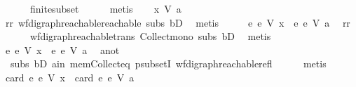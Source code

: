 \begin{isabellebody}
\ \ \ \ \ \ finite{\isacharunderscore}{\kern0pt}subset\isanewline
\ \ \ \ \isamarkupfalse%
\ metis\isanewline
\ \ \isamarkupfalse%
\ {\isachardoublequoteopen}x\ {\isasymrightarrow}\isactrlsup {\isacharasterisk}{\kern0pt}\isactrlbsub V\isactrlesub \ a{\isachardoublequoteclose}\ \isamarkupfalse%
\ rr\ wf{\isacharunderscore}{\kern0pt}digraph{\isachardot}{\kern0pt}reachable{}{\isacharunderscore}{\kern0pt}reachable\ subs\ bD{}\ \isamarkupfalse%
\ metis\isanewline
\ \ \isamarkupfalse%
\ \isamarkupfalse%
\ {\isachardoublequoteopen}{\isacharbraceleft}{\kern0pt}e{\isachardot}{\kern0pt}\ e\ {\isasymrightarrow}\isactrlsup {\isacharasterisk}{\kern0pt}\isactrlbsub V\isactrlesub \ x{\isacharbraceright}{\kern0pt}\ {\isasymsubseteq}\ {\isacharbraceleft}{\kern0pt}e{\isachardot}{\kern0pt}\ e\ {\isasymrightarrow}\isactrlsup {\isacharasterisk}{\kern0pt}\isactrlbsub V\isactrlesub \ a{\isacharbraceright}{\kern0pt}{\isachardoublequoteclose}\ \isamarkupfalse%
\ rr\isanewline
\ \ \ \ \ \ wf{\isacharunderscore}{\kern0pt}digraph{\isachardot}{\kern0pt}reachable{\isacharunderscore}{\kern0pt}trans\ Collect{\isacharunderscore}{\kern0pt}mono\ subs\ bD{}\ \isamarkupfalse%
\ metis\isanewline
\ \ \isamarkupfalse%
\ \isamarkupfalse%
\ {\isachardoublequoteopen}{\isacharbraceleft}{\kern0pt}e{\isachardot}{\kern0pt}\ e\ {\isasymrightarrow}\isactrlsup {\isacharasterisk}{\kern0pt}\isactrlbsub V\isactrlesub \ x{\isacharbraceright}{\kern0pt}\ {\isasymsubset}\ {\isacharbraceleft}{\kern0pt}e{\isachardot}{\kern0pt}\ e\ {\isasymrightarrow}\isactrlsup {\isacharasterisk}{\kern0pt}\isactrlbsub V\isactrlesub \ a{\isacharbraceright}{\kern0pt}{\isachardoublequoteclose}\ \isamarkupfalse%
\ a{\isacharunderscore}{\kern0pt}not\isanewline
\ \ subs\ bD{}\ a{\isacharunderscore}{\kern0pt}in\ mem{\isacharunderscore}{\kern0pt}Collect{\isacharunderscore}{\kern0pt}eq\ psubsetI\ wf{\isacharunderscore}{\kern0pt}digraph{\isachardot}{\kern0pt}reachable{\isacharunderscore}{\kern0pt}refl\isanewline
\ \ \ \ \isamarkupfalse%
\ metis\ \isanewline
\ \ \isamarkupfalse%
\ \isamarkupfalse%
\ {\isachardoublequoteopen}card\ {\isacharbraceleft}{\kern0pt}e{\isachardot}{\kern0pt}\ e\ {\isasymrightarrow}\isactrlsup {\isacharasterisk}{\kern0pt}\isactrlbsub V\isactrlesub \ x{\isacharbraceright}{\kern0pt}\ {\isacharless}{\kern0pt}\ card\ {\isacharbraceleft}{\kern0pt}e{\isachardot}{\kern0pt}\ e\ {\isasymrightarrow}\isactrlsup {\isacharasterisk}{\kern0pt}\isactrlbsub V\isactrlesub \ a{\isacharbraceright}{\kern0pt}{\isachardoublequoteclose}\ \isamarkupfalse%

\end{isabellebody}
